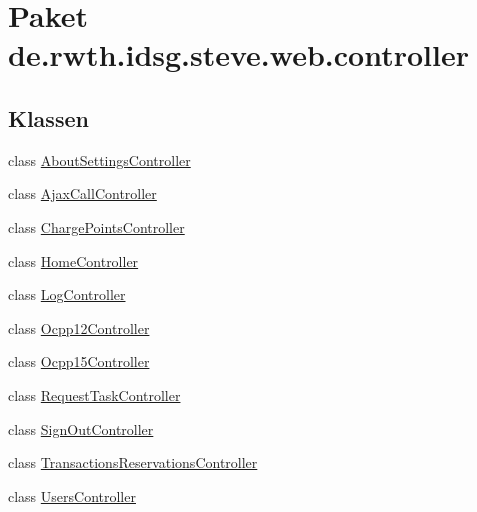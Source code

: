 \hypertarget{namespacede_1_1rwth_1_1idsg_1_1steve_1_1web_1_1controller}{\section{Paket de.\-rwth.\-idsg.\-steve.\-web.\-controller}
\label{namespacede_1_1rwth_1_1idsg_1_1steve_1_1web_1_1controller}
}
\subsection*{Klassen}
\begin{DoxyCompactItemize}
\item 
class \hyperlink{classde_1_1rwth_1_1idsg_1_1steve_1_1web_1_1controller_1_1_about_settings_controller}{About\-Settings\-Controller}
\item 
class \hyperlink{classde_1_1rwth_1_1idsg_1_1steve_1_1web_1_1controller_1_1_ajax_call_controller}{Ajax\-Call\-Controller}
\item 
class \hyperlink{classde_1_1rwth_1_1idsg_1_1steve_1_1web_1_1controller_1_1_charge_points_controller}{Charge\-Points\-Controller}
\item 
class \hyperlink{classde_1_1rwth_1_1idsg_1_1steve_1_1web_1_1controller_1_1_home_controller}{Home\-Controller}
\item 
class \hyperlink{classde_1_1rwth_1_1idsg_1_1steve_1_1web_1_1controller_1_1_log_controller}{Log\-Controller}
\item 
class \hyperlink{classde_1_1rwth_1_1idsg_1_1steve_1_1web_1_1controller_1_1_ocpp12_controller}{Ocpp12\-Controller}
\item 
class \hyperlink{classde_1_1rwth_1_1idsg_1_1steve_1_1web_1_1controller_1_1_ocpp15_controller}{Ocpp15\-Controller}
\item 
class \hyperlink{classde_1_1rwth_1_1idsg_1_1steve_1_1web_1_1controller_1_1_request_task_controller}{Request\-Task\-Controller}
\item 
class \hyperlink{classde_1_1rwth_1_1idsg_1_1steve_1_1web_1_1controller_1_1_sign_out_controller}{Sign\-Out\-Controller}
\item 
class \hyperlink{classde_1_1rwth_1_1idsg_1_1steve_1_1web_1_1controller_1_1_transactions_reservations_controller}{Transactions\-Reservations\-Controller}
\item 
class \hyperlink{classde_1_1rwth_1_1idsg_1_1steve_1_1web_1_1controller_1_1_users_controller}{Users\-Controller}
\end{DoxyCompactItemize}
